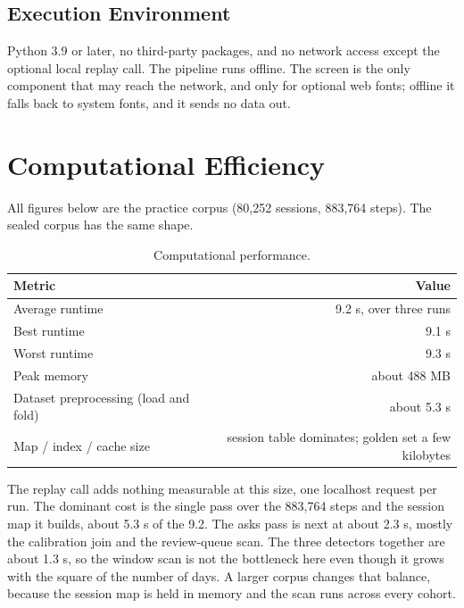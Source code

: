 \documentclass[8pt,twocolumn,a4paper]{extarticle}
\begin{document}
\subsection{Execution Environment}

Python 3.9 or later, no third-party packages, and no network access
except the optional local replay call. The pipeline runs offline. The
screen is the only component that may reach the network, and only for
optional web fonts; offline it falls back to system fonts, and it sends
no data out.


\section{Computational Efficiency}

All figures below are the practice corpus (80,252 sessions, 883,764
steps). The sealed corpus has the same shape.

\begin{table}[H]
\centering
\caption{Computational performance.}
\label{tab:compute}
\small
\begin{tabularx}{\columnwidth}{@{}X r@{}}
\toprule
\textbf{Metric} & \textbf{Value} \\
\midrule
Average runtime & 9.2 s, over three runs \\
Best runtime & 9.1 s \\
Worst runtime & 9.3 s \\
Peak memory & about 488 MB \\
Dataset preprocessing (load and fold) & about 5.3 s \\
Map / index / cache size & session table dominates; golden set a few kilobytes \\
\bottomrule
\end{tabularx}
\end{table}

The replay call adds nothing measurable at this size, one localhost
request per run. The dominant cost is the single pass over the 883,764
steps and the session map it builds, about 5.3 s of the 9.2. The asks
pass is next at about 2.3 s, mostly the calibration join and the
review-queue scan. The three detectors together are about 1.3 s, so the
window scan is not the bottleneck here even though it grows with the
square of the number of days. A larger corpus changes that balance,
because the session map is held in memory and the scan runs across
every cohort.
\end{document}
